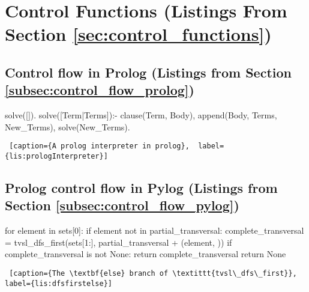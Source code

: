 \section{Control Functions (Listings From Section \ref{sec:control_functions})} \label{appsec:control_functions}

\subsection{Control flow in Prolog (Listings from Section \ref{subsec:control_flow_prolog})} \label{appsubsec:control_flow_prolog}

\begin{minipage}{\linewidth} \hrulefill
\begin{python}[numbers=left]
solve([]).
solve([Term|Terms]):-
  clause(Term, Body), 
  append(Body, Terms, New_Terms), 
  solve(New_Terms).
\end{python}
\begin{lstlisting} [caption={A prolog interpreter in prolog},  label={lis:prologInterpreter}]
\end{lstlisting}
\end{minipage}


\subsection{Prolog control flow in Pylog (Listings from Section \ref{subsec:control_flow_pylog})} \label{appsubsec:control_flow_pylog}

\begin{minipage}{\linewidth}   \hrulefill
\begin{python}[numbers=left]
    for element in sets[0]:
      if element not in partial_transversal:
        complete_transversal = tvsl_dfs_first(sets[1:], partial_transversal + (element, ))
        if complete_transversal is not None:
          return complete_transversal 
    return None
\end{python}
\begin{lstlisting} [caption={The \textbf{else} branch of \textittt{tvsl\_dfs\_first}}, label={lis:dfsfirstelse}]
\end{lstlisting}
\end{minipage}



